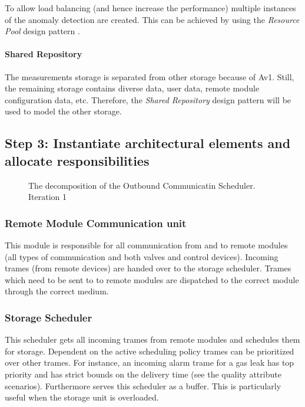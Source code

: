 \npar To allow load balancing (and hence increase the performance) multiple
instances of the anomaly detection are created. This can be achieved by using
the \emph{Resource Pool} design pattern \citep[see][p.~503]{Buschmann:07}. 

\paragraph{Shared Repository}

\npar The measurements storage is separated from other storage because of Av1.
Still, the remaining storage contains diverse data, user data, remote module
configuration data, etc. Therefore, the \emph{Shared Repository} design pattern
\citep[see][p.~202]{Buschmann:07} will be used to model the other storage.

\subsection{Step 3: Instantiate architectural elements and allocate responsibilities}
\label{add:it1/elements}

\begin{figure}[H]
	\begin{centering}
		\caption{The decomposition of the Outbound Communicatin Scheduler. Iteration
		1}
		\label{fig:add/it1/decomposition}
	\end{centering}
\end{figure}

\subsubsection{Remote Module Communication unit}

\npar This module is responsible for all communication from and to remote
modules (all types of communication and both valves and control devices).
Incoming trames (from remote devices) are handed over to the storage scheduler.
Trames which need to be sent to to remote modules are dispatched to the correct
module through the correct medium.

\subsubsection{Storage Scheduler}

\npar This scheduler gets all incoming trames from remote modules and schedules
them for storage. Dependent on the active scheduling policy trames can be
prioritized over other trames. For instance, an incoming alarm trame for a gas
leak has top priority and has strict bounds on the delivery time (see the
quality attribute scenarios). Furthermore serves this scheduler as a buffer.
This is particularly useful when the storage unit is overloaded.

